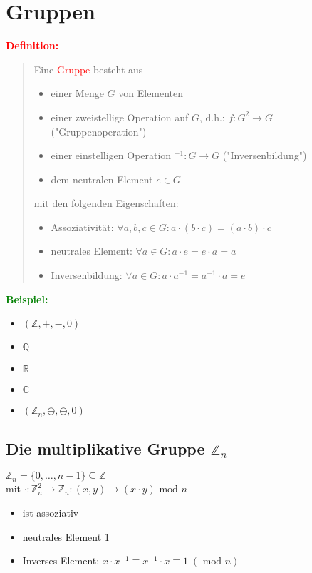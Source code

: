 \documentclass{article}
\newcommand{\red}[1]{\textcolor{red}{#1}}
\newcommand{\green}[1]{\textcolor{green}{#1}}
\newcommand{\ex}{\green{\textbf{Beispiel: }}}
\newcommand{\de}[1]{\red{\textbf{Definition: }}\begin{quote}#1\end{quote}}
\newcommand{\Z}{\mathbb{Z}}
\newcommand{\Q}{\mathbb{Q}}
\newcommand{\R}{\mathbb{R}}
\newcommand{\C}{\mathbb{C}}
\renewcommand{\mod}{\text{ mod }}
\begin{document}
\newpage
\section{Gruppen}

\de{
    Eine \red{Gruppe} besteht aus
    \begin{itemize}
        \item einer Menge $G$ von Elementen
        \item einer zweistellige Operation auf $G$, d.h.: $f: G^2 \to G$ ("Gruppenoperation")
        \item einer einstelligen Operation $^{-1}: G \to G$ ("Inversenbildung")
        \item dem neutralen Element $e \in G$
    \end{itemize}
    mit den folgenden Eigenschaften:
    \begin{itemize}
        \item Assoziativität: $\forall a,b,c \in G: a \cdot (b \cdot c) = (a \cdot b) \cdot c$
        \item neutrales Element: $\forall a \in G: a \cdot e = e \cdot a = a$
        \item Inversenbildung: $\forall a \in G: a \cdot a^{-1} = a^{-1} \cdot a = e$
    \end{itemize}
}
\ex \begin{itemize}
    \item $(\Z,+,-,0)$
    \item $\Q$
    \item $\R$
    \item $\C$
    \item $(\Z_n, \oplus, \ominus, 0)$
\end{itemize}

\subsection{\texorpdfstring{Die multiplikative Gruppe $\Z_n$}{Die multiplikative Gruppe Z}}

$\Z_n = \{0, \dots, n - 1\} \subseteq \Z$\\
mit $\cdot: \Z_n^2 \to \Z_n: (x,y) \mapsto (x \cdot y) \mod n$
\begin{itemize}
    \item ist assoziativ \checkmark
    \item neutrales Element 1
    \item Inverses Element: $x \cdot x^{-1} \equiv x^{-1} \cdot x \equiv 1 \; (\mod n)$
\end{itemize} 
\end{document}
